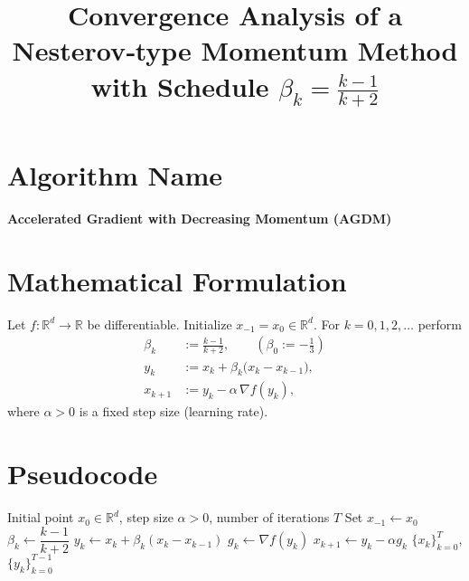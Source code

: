 \documentclass[11pt]{article}
\newcommand{\R}{\mathbb{R}}
\begin{document}
\title{Convergence Analysis of a Nesterov‑type Momentum Method\\
with Schedule $\displaystyle \beta_k=\frac{k-1}{k+2}$}
\author{}
\date{}
\maketitle

\section*{Algorithm Name}
\textbf{Accelerated Gradient with Decreasing Momentum (AGDM)}  

\section*{Mathematical Formulation}
Let $f:\R^d\rightarrow\R$ be differentiable.  
Initialize $x_{-1}=x_0\in\R^d$. For $k=0,1,2,\dots$ perform
\[
\boxed{
\begin{aligned}
\beta_k &:= \frac{k-1}{k+2}, \qquad (\beta_0:=-\tfrac13)\\[0.2em]
y_k    &:= x_k+\beta_k\bigl(x_k-x_{k-1}\bigr),\\[0.2em]
x_{k+1}&:= y_k-\alpha\,\nabla f(y_k),
\end{aligned}}
\tag{1}
\]
where $\alpha>0$ is a fixed step size (learning rate).  

\section*{Pseudocode}
\begin{algorithm}[H]
\caption{AGDM}
\begin{algorithmic}[1]
\REQUIRE Initial point $x_0\in\R^d$, step size $\alpha>0$, number of iterations $T$
\STATE Set $x_{-1}\leftarrow x_0$
    \STATE $\beta_k \leftarrow \dfrac{k-1}{k+2}$ 
    \STATE $y_k \leftarrow x_k + \beta_k (x_k-x_{k-1})$
    \STATE $g_k \leftarrow \nabla f(y_k)$
    \STATE $x_{k+1} \leftarrow y_k - \alpha g_k$
\ENDFOR
\RETURN $\{x_k\}_{k=0}^{T}$, $\{y_k\}_{k=0}^{T-1}$
\end{algorithmic}
\end{algorithm}

\end{document}
